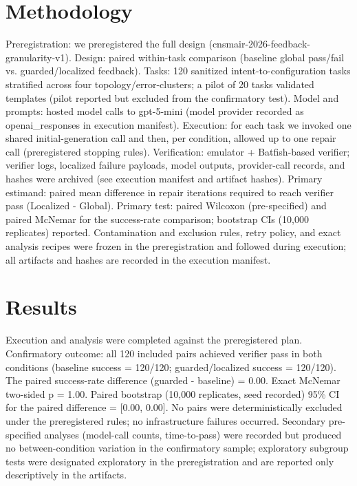 \documentclass[conference]{IEEEtran}
\begin{document}
\section{Methodology}
Preregistration: we preregistered the full design (cnsmair-2026-feedback-granularity-v1). Design: paired within-task comparison (baseline global pass/fail vs. guarded/localized feedback). Tasks: 120 sanitized intent-to-configuration tasks stratified across four topology/error-clusters; a pilot of 20 tasks validated templates (pilot reported but excluded from the confirmatory test). Model and prompts: hosted model calls to gpt-5-mini (model provider recorded as openai\_responses in execution manifest). Execution: for each task we invoked one shared initial-generation call and then, per condition, allowed up to one repair call (preregistered stopping rules). Verification: emulator + Batfish-based verifier; verifier logs, localized failure payloads, model outputs, provider-call records, and hashes were archived (see execution manifest and artifact hashes). Primary estimand: paired mean difference in repair iterations required to reach verifier pass (Localized - Global). Primary test: paired Wilcoxon (pre-specified) and paired McNemar for the success-rate comparison; bootstrap CIs (10,000 replicates) reported. Contamination and exclusion rules, retry policy, and exact analysis recipes were frozen in the preregistration and followed during execution; all artifacts and hashes are recorded in the execution manifest.

\section{Results}
Execution and analysis were completed against the preregistered plan. Confirmatory outcome: all 120 included pairs achieved verifier pass in both conditions (baseline success = 120/120; guarded/localized success = 120/120). The paired success-rate difference (guarded - baseline) = 0.00. Exact McNemar two-sided p = 1.00. Paired bootstrap (10,000 replicates, seed recorded) 95\% CI for the paired difference = [0.00, 0.00]. No pairs were deterministically excluded under the preregistered rules; no infrastructure failures occurred. Secondary pre-specified analyses (model-call counts, time-to-pass) were recorded but produced no between-condition variation in the confirmatory sample; exploratory subgroup tests were designated exploratory in the preregistration and are reported only descriptively in the artifacts.
\end{document}
